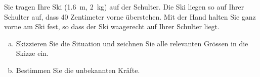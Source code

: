 
\begin{aufgabe}
	Sie tragen Ihre Ski (\SI{1.6}{m}, \SI{2}{kg}) auf der Schulter.
	Die Ski liegen so auf Ihrer Schulter auf, dass 40 Zentimeter vorne überstehen.
	Mit der Hand halten Sie ganz vorne am Ski fest, so dass der Ski waagerecht auf Ihrer Schulter liegt.

	\begin{enumerate}[a)]
		\item Skizzieren Sie die Situation und zeichnen Sie alle relevanten Grössen in die Skizze ein.
		\item Bestimmen Sie die unbekannten Kräfte.
	\end{enumerate}
\end{aufgabe}

